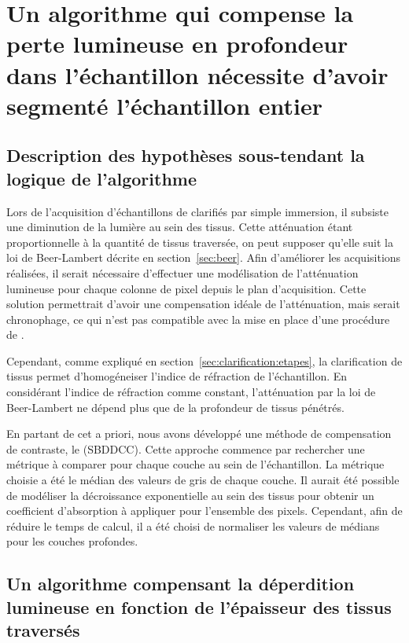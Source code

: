 \documentclass[\main/main.tex]{subfiles}
\begin{document}
\section{Un algorithme qui compense la perte lumineuse en profondeur dans l'échantillon nécessite d'avoir segmenté l'échantillon entier
\label{sbddcc}
}

\subsection{Description des hypothèses sous\hyp{}tendant la logique de l'algorithme}

%
Lors de l'acquisition d'échantillons de \pz{} clarifiés par simple immersion,
il subsiste une diminution de la lumière au sein des tissus.
%
Cette atténuation étant proportionnelle à la quantité de tissus traversée,
on peut supposer qu'elle suit la loi de Beer\hyp{}Lambert décrite en section~\ref{sec:beer}.
%
Afin d'améliorer les acquisitions réalisées,
il serait nécessaire d'effectuer une modélisation de l'atténuation lumineuse pour chaque colonne de pixel depuis le plan d'acquisition.
%
Cette solution permettrait d'avoir une compensation idéale de l'atténuation, mais serait chronophage, ce qui n'est pas compatible avec la mise en place d'une procédure de \hcs{}.

%
Cependant, comme expliqué en section~\ref{sec:clarification:etapes}, la clarification de tissus permet d'homogéneiser l'indice de réfraction de l'échantillon.
%
En considérant l'indice de réfraction comme constant, l'atténuation par la loi de Beer\hyp{}Lambert ne dépend plus que de la profondeur de tissus pénétrés.

%
En partant de cet a priori, nous avons développé une méthode de compensation de contraste, le \sbddcc (SBDDCC).
%
Cette approche commence par rechercher une métrique à comparer pour chaque couche au sein de l'échantillon.
%
La métrique choisie a été le médian des valeurs de gris de chaque couche.
%
Il aurait été possible de modéliser la décroissance exponentielle au sein des tissus pour obtenir un coefficient d'absorption à appliquer pour l'ensemble des pixels.
%
Cependant, afin de réduire le temps de calcul, il a été choisi de normaliser les valeurs de médians pour les couches profondes.

\subsection{Un algorithme compensant la déperdition lumineuse en fonction de l'épaisseur des tissus traversés}
\end{document}

